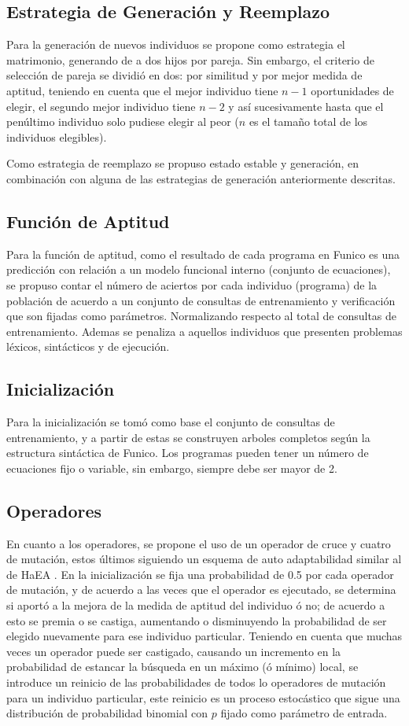 \documentclass{llncs}
\begin{document}
\subsection{Estrategia de Generación y Reemplazo}
Para la generación de nuevos individuos se propone como estrategia el matrimonio, generando de a dos hijos por pareja. Sin embargo, el criterio de selección de pareja se dividió en dos: por similitud y por mejor medida de aptitud, teniendo en cuenta que el mejor individuo tiene $n-1$ oportunidades de elegir, el segundo mejor individuo tiene $n-2$ y así sucesivamente hasta que el penúltimo individuo solo pudiese elegir al peor ($n$ es el tamaño total de los individuos elegibles).

Como estrategia de reemplazo se propuso estado estable y generación, en combinación con alguna de las estrategias de generación anteriormente descritas.

\subsection{Función de Aptitud}
Para la función de aptitud, como el resultado de cada programa en Funico es una predicción con relación a un modelo funcional interno (conjunto de ecuaciones), se propuso contar el número de aciertos por cada individuo (programa) de la población de acuerdo a un conjunto de consultas de entrenamiento y verificación que son fijadas como parámetros. Normalizando respecto al total de consultas de entrenamiento. Ademas se penaliza a aquellos individuos que presenten problemas léxicos, sintácticos y de ejecución.
\subsection{Inicialización}
Para la inicialización se tomó como base el conjunto de consultas de entrenamiento, y a partir de estas se construyen arboles completos según la estructura sintáctica de Funico. Los programas pueden tener un número de ecuaciones fijo o variable, sin embargo, siempre debe ser mayor de 2.

\subsection{Operadores}
En cuanto a los operadores, se propone el uso de un operador de cruce y cuatro de mutación, estos últimos siguiendo un esquema de auto adaptabilidad similar al de HaEA \cite{gomez}. En la inicialización se fija una probabilidad de 0.5 por cada operador de mutación, y de acuerdo a las veces que el operador es ejecutado, se determina si aportó a la mejora de la medida de aptitud del individuo ó no; de acuerdo a esto se premia o se castiga, aumentando o disminuyendo la probabilidad de ser elegido nuevamente para ese individuo particular. Teniendo en cuenta que muchas veces un operador puede ser castigado, causando un incremento en la probabilidad de estancar la búsqueda en un máximo (ó mínimo) local, se introduce un reinicio de las probabilidades de todos lo operadores de mutación para un individuo particular, este reinicio es un proceso estocástico que sigue una distribución de probabilidad binomial con $p$ fijado como parámetro de entrada.
\end{document}
